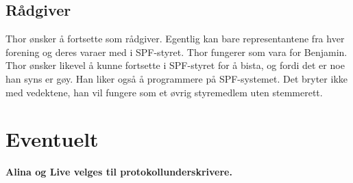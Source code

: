 \documentclass[a4paper,norsk]{article}
\begin{document}
\subsection{Rådgiver} 
Thor ønsker å fortsette som rådgiver. Egentlig kan bare representantene fra hver forening og deres varaer med i SPF-styret. Thor fungerer som vara for Benjamin. Thor ønsker likevel å kunne fortsette i SPF-styret for å bista, og fordi det er noe han syns er gøy. Han liker også å programmere på SPF-systemet. Det bryter ikke med vedektene, han vil fungere som et øvrig styremedlem uten stemmerett. 

\section{Eventuelt}
\textbf{Alina og Live velges til protokollunderskrivere.}
\end{document}
